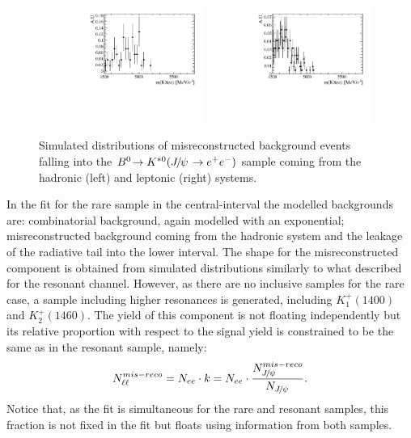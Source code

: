 \begin{figure}[h!]
\centering
\includegraphics[width=0.48\textwidth]{RKst/figs/misreco/part_had_jpsi.pdf}
\includegraphics[width=0.48\textwidth]{RKst/figs/misreco/part_lpt_jpsi.pdf}
\caption{Simulated distributions of misreconstructed background events falling into
the $\decay{\Bz}{\Kstarz(\jpsi\to\ee)}$ sample coming from the
hadronic (left) and leptonic (right) systems.}
\label{fig:RKst_misreco_distrib}
\end{figure}

In the fit for the rare sample in the central-\qsq interval the modelled
backgrounds are: combinatorial background, again modelled with an exponential; misreconstructed background
coming from the hadronic system and the leakage of the \jpsi radiative tail into the lower \qsq interval.
The shape for the misreconstructed component is obtained from simulated distributions similarly to what described
for the resonant channel. However, as there are no inclusive samples for the rare case,
a sample including higher \Kstar resonances is generated, including $K_1^+(1400)$ and $K_2^+(1460)$.
The yield of this component is not floating independently but its relative proportion
with respect to the signal yield is constrained to be the same as in the resonant sample, namely:
\begin{equation}
N_{\ell\ell}^{mis-reco} = N_{ee} \cdot k = N_{ee} \cdot \frac{N_{\jpsi}^{mis-reco}}{N_{\jpsi}}.
\end{equation}
Notice that, as the fit is simultaneous for the rare and resonant samples, this fraction
is not fixed in the fit but floats using information from both samples.

